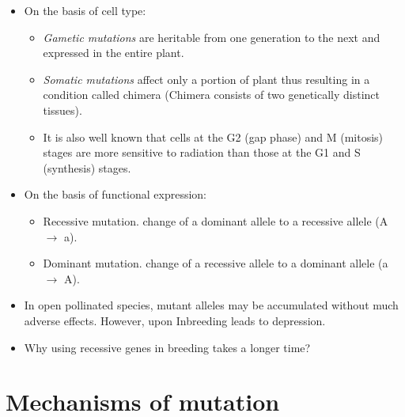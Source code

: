\documentclass[11pt,ignorenonframetext,aspectratio=169]{beamer}
\providecommand{\tightlist}{%
  \setlength{\itemsep}{0pt}\setlength{\parskip}{0pt}}
\begin{document}
\begin{frame}{}
\protect\hypertarget{section-2}{}
\begin{itemize}
\tightlist
\item
  On the basis of cell type:

  \begin{itemize}
  \tightlist
  \item
    \emph{Gametic mutations} are heritable from one generation to the
    next and expressed in the entire plant.
  \item
    \emph{Somatic mutations} affect only a portion of plant thus
    resulting in a condition called chimera (Chimera consists of two
    genetically distinct tissues).
  \item
    It is also well known that cells at the G2 (gap phase) and M
    (mitosis) stages are more sensitive to radiation than those at the
    G1 and S (synthesis) stages.
  \end{itemize}
\item
  On the basis of functional expression:

  \begin{itemize}
  \tightlist
  \item
    Recessive mutation. change of a dominant allele to a recessive
    allele (A \(\rightarrow\) a).
  \item
    Dominant mutation. change of a recessive allele to a dominant allele
    (a \(\rightarrow\) A).
  \end{itemize}
\item
  In open pollinated species, mutant alleles may be accumulated without
  much adverse effects. However, upon Inbreeding leads to depression.
\item
  Why using recessive genes in breeding takes a longer time?
\end{itemize}
\end{frame}

\hypertarget{mechanisms-of-mutation}{%
\section{Mechanisms of mutation}\label{mechanisms-of-mutation}}
\end{document}
